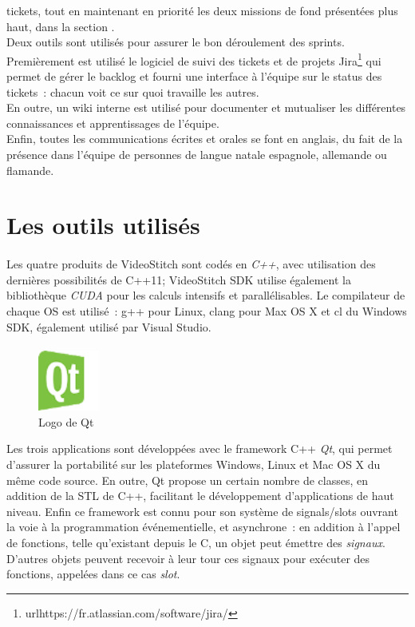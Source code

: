 tickets, tout en maintenant en priorité les deux missions de fond présentées plus haut, dans 
la section .\\
\newline
Deux outils sont utilisés pour assurer le bon déroulement des sprints. Premièrement
est utilisé le logiciel de suivi des tickets et de projets Jira\footnote{url{https://fr.atlassian.com/software/jira/}}
qui permet de gérer le backlog et fourni une interface à l'équipe sur le status des
tickets~: chacun voit ce sur quoi travaille les autres.\\
En outre, un wiki interne est utilisé pour documenter et mutualiser les différentes
connaissances et apprentissages de l'équipe.\\
Enfin, toutes les communications écrites et orales se font en anglais, du fait
de la présence dans l'équipe de personnes de langue natale espagnole, allemande ou flamande.

\section{Les outils utilisés}
\label{outils-utilisés}
\paragraph{}
Les quatre produits de VideoStitch sont codés en \emph{C++}, avec utilisation des dernières possibilités
de C++11; VideoStitch SDK utilise également la bibliothèque \emph{CUDA} pour les calculs intensifs et parallélisables.
Le compilateur de chaque OS est utilisé~: g++ pour Linux, clang pour Max OS X et 
cl du Windows SDK, également utilisé par Visual Studio.
\paragraph{}
\begin{figure}
  \centering
  \includegraphics[width=2cm]{images/qt-logo.png}
  \caption{Logo de Qt}
\end{figure}
Les trois applications sont  
développées avec le framework C++ \emph{Qt}, qui permet d'assurer la portabilité sur les 
plateformes Windows, Linux et Mac OS X du même code source. En outre, Qt
propose un certain nombre de classes, en addition de la STL de C++, facilitant le
développement d'applications de haut niveau. Enfin ce framework est connu pour son
système de signals/slots ouvrant la voie à la programmation événementielle, et
asynchrone~: en addition à l'appel de fonctions, telle qu'existant depuis le C,
un objet peut émettre des \textit{signaux}. D'autres objets peuvent recevoir à leur tour
ces signaux pour exécuter des fonctions, appelées dans ce cas \textit{slot}.\cite{qt}
